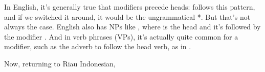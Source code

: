 In English, it's generally true that modifiers precede heads:  follows this pattern, and if we switched it around, it would be the ungrammatical *. But that's not always the case. English also has NPs like , where  is the head and it's followed by the modifier . And in verb phrases (VPs), it's actually quite common for a modifier, such as the adverb  to follow the head verb, as in .

Now, returning to Riau Indonesian,

